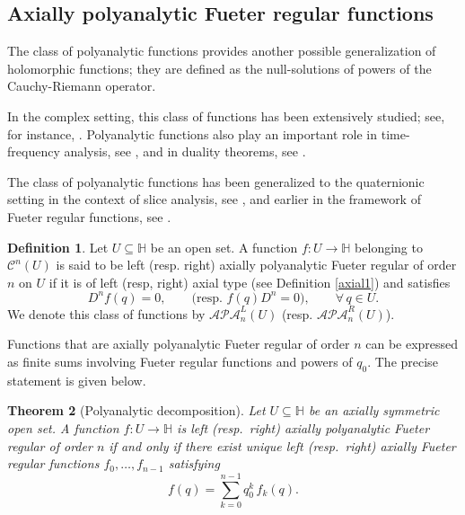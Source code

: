 \documentclass[reqno,11pt]{amsart}
\numberwithin{equation}{section}
\newtheorem{theorem}{Theorem}[section]
\theoremstyle{definition}
\newtheorem{definition}[theorem]{Definition}
\begin{document}
\subsection{Axially polyanalytic Fueter regular functions}

The class of polyanalytic functions provides another possible generalization of holomorphic functions; they are defined as the null-solutions of powers of the Cauchy-Riemann operator.

In the complex setting, this class of functions has been extensively studied; see, for instance, \cite{Balk1, Balk2, V1}. Polyanalytic functions also play an important role in time-frequency analysis, see \cite{A1, AF}, and in duality theorems, see \cite{CDDS}.

The class of polyanalytic functions has been generalized to the quaternionic setting in the context of slice analysis, see \cite{ADS, ADS2019}, and earlier in the framework of Fueter regular functions, see \cite{B1976}.




\begin{definition}
\label{polyorder2}
Let $U \subseteq \mathbb{H}$ be an open set. A function $f \colon U \to \mathbb{H}$ belonging to $\mathcal{C}^n(U)$ is said to be left (resp. right) axially polyanalytic Fueter regular of order $n$ on $U$ if it is of  left (resp, right) axial type (see Definition \ref{axial1}) and satisfies
$$
D^n f(q)=0,
\qquad
\text{(resp.\ } f(q)D^n=0\text{)},
\qquad \forall\, q \in U.
$$
We denote this class of functions by $ \mathcal{APA}_n^L(U)$ (resp. $ \mathcal{APA}_n^R(U)$).
\end{definition}



Functions that are axially polyanalytic Fueter regular of order $n$ can be expressed as finite sums involving Fueter regular functions and powers of $q_0$. The precise statement is given below.


\begin{theorem}[Polyanalytic decomposition]
\label{polydeco}
Let $U \subseteq \mathbb{H}$ be an  axially symmetric open set. A function $f \colon U \to \mathbb{H}$ is left (resp.\ right) axially polyanalytic Fueter regular of order $n$ if and only if there exist unique left (resp.\ right) axially Fueter regular functions $f_0,\ldots,f_{n-1}$ satisfying
	\begin{equation}
		\label{deco}
		f(q)=\sum_{k=0}^{n-1} q_0^k\, f_k(q).
	\end{equation}
\end{theorem}
\end{document}
